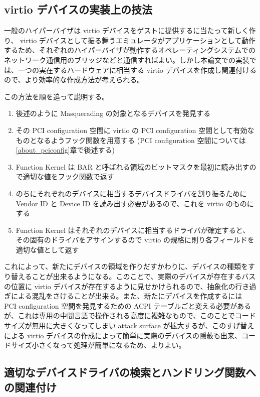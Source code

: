 \documentclass[a4paper,11pt,report]{ltjsbook}
\begin{document}
\subsection{virtio デバイスの実装上の技法}
\label{overview_vio}
一般のハイパーバイザは virtio デバイスをゲストに提供するに当たって新しく作り、 virtio デバイスとして振る舞うエミュレータがアプリケーションとして動作するため、それぞれのハイパーバイザが動作するオペレーティングシステムでのネットワーク通信用のブリッジなどと通信すればよい。しかし本論文での実装では、一つの実在するハードウェアに相当する virtio デバイスを作成し関連付けるので、より効率的な作成方法が考えられる。

この方法を順を追って説明する。

\begin{enumerate}
\item 後述のように Masquerading の対象となるデバイスを発見する
\item その PCI configuration 空間に virtio の PCI configuration 空間として有効なものとなるようフック関数を用意する (PCI configuration 空間については\ref{about_pciconfig}章で後述する)
\item Function Kernel は BAR と呼ばれる領域のビットマスクを最初に読み出すので適切な値をフック関数で返す
\item のちにそれぞれのデバイスに相当するデバイスドライバを割り振るために Vendor ID と Device ID を読み出す必要があるので、これを virtio のものにする
\item Function Kernel はそれぞれのデバイスに相当するドライバが確定すると、その固有のドライバをアサインするので virtio の規格に則り各フィールドを適切な値として返す
\end{enumerate}

これによって、新たにデバイスの領域を作りだすかわりに、デバイスの種類をすり替えることが出来るようになる。このことで、実際のデバイスが存在するバスの位置に virtio デバイスが存在するように見せかけられるので、抽象化の行き過ぎによる混乱をさけることが出来る。また、新たにデバイスを作成するには PCI configuration 空間を発見するための ACPI テーブルごと変える必要があるが、これは専用の中間言語で操作される高度に複雑なもので、このことでコードサイズが無用に大きくなってしまい attack surface が拡大するが、このすげ替えによる virtio デバイスの作成によって簡単に実際のデバイスの隠蔽も出来、コードサイズ小さくなって処理が簡単になるため、よりよい。

\subsection{適切なデバイスドライバの検索とハンドリング関数への関連付け}
\end{document}
